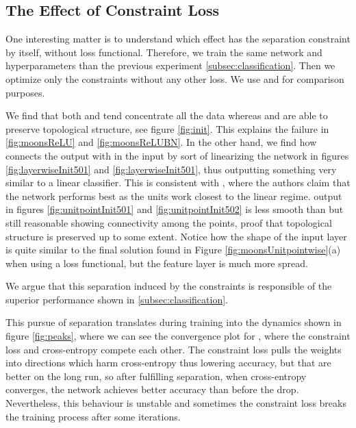 \subsection{The Effect of Constraint Loss}\label{subsec:effectConstraintLoss}

One interesting matter is to understand which effect has the separation constraint by itself, without loss functional. Therefore, we train the same network and hyperparameters than the previous experiment  \ref{subsec:classification}. Then we optimize only the constraints without any other loss. We use \ReLU and \ReLUBN for comparison purposes. 

We find that both \ReLU and \ReLUBN tend concentrate all the data whereas \SepUnitPoint and \SepLayer are able to preserve topological structure, see figure \ref{fig:init}. This explains the failure in \ref{fig:moonsReLU} and \ref{fig:moonsReLUBN}. 
In the other hand, we find how \SepLayer connects the output with in the input by sort of linearizing the network in figures \ref{fig:layerwiseInit501} and \ref{fig:layerwiseInit501}, thus outputting something very similar to a linear classifier. This is consistent with \cite{batchnormGradientExplosion}, where the authors claim that the network performs best as the units work closest to the linear regime. 
\SepUnitPoint output in figures \ref{fig:unitpointInit501} and \ref{fig:unitpointInit502} is less smooth than \SepLayer but still reasonable showing connectivity among the points, proof that topological structure is preserved up to some extent. Notice how the shape of the input layer is quite similar to the final solution found in Figure \ref{fig:moonsUnitpointwise}(a) when using a loss functional, but the feature layer is much more spread. 

We argue that this separation induced by the constraints is responsible of the superior performance shown in \ref{subsec:classification}.

This pursue of separation translates during training into the dynamics shown in figure \ref{fig:peaks}, where we can see the convergence plot for \SepUnitPoint, where the constraint loss and cross-entropy compete each other. The constraint loss pulls the weights into directions which harm cross-entropy thus lowering accuracy, but that are better on the long run, so after fulfilling separation, when cross-entropy converges, the network achieves better accuracy than before the drop. Nevertheless, this behaviour is unstable and sometimes the constraint loss breaks the training process after some iterations.

